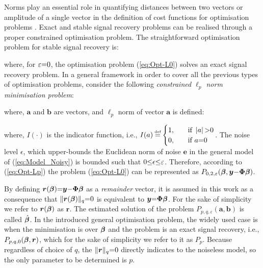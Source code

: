 Norms play an essential role in quantifying distances between two vectors or amplitude of a single vector in the definition of cost functions for optimisation problems \cite{Walter2014}.
Exact and stable signal recovery problems can be realised through a proper constrained optimisation problem.
The straightforward optimisation problem for stable signal recovery is:

where, for $\varepsilon {=} 0$, the optimisation problem (\ref{eq:Opt-L0}) solves an exact signal recovery problem.
In a general framework in order to cover all the previous types of optimisation problems, consider the following \emph{constrained $\ell_p$ norm minimisation problem}:

where, $\boldsymbol{a}$ and $\boldsymbol{b}$ are vectors, and $\ell_p$ norm of vector $\boldsymbol{a}$ is defined:

where, $I(\cdot)$ is the indicator function, i.e., $I(a) \myeq
  \begin{cases}
    1,  & \quad \text{if } \myabs{a} \sg 0\\
    0,  & \quad \text{if } a \seq 0\\
  \end{cases}$.
The noise level $\epsilon$, which upper-bounds the Euclidean norm of noise $\boldsymbol{e}$ in the general model of (\ref{eq:Model_Noisy}) is bounded such that $0 {\leq} \epsilon {\leq} \varepsilon$.
Therefore, according to (\ref{eq:Opt-Lp}) the problem (\ref{eq:Opt-L0}) can be represented as $P_{0,2,\varepsilon} (\boldsymbol{\beta},\boldsymbol{y} {-} \boldsymbol{\Phi} \boldsymbol{\beta})$.

By defining $\boldsymbol{r} (\boldsymbol{\beta}) {=} \boldsymbol{y} {-} \boldsymbol{\Phi} \boldsymbol{\beta}$ as a \emph{remainder} vector, it is assumed in this work as a consequence that $\Vert \boldsymbol{r} (\boldsymbol{\beta}) \Vert _q {=} 0$ is equivalent to $\boldsymbol{y} {=} \boldsymbol{\Phi} \boldsymbol{\beta}$. 
For the sake of simplicity we refer to $\boldsymbol{r} (\boldsymbol{\beta})$ as $\boldsymbol{r}$.
The estimated solution of the problem $P_{p,q,\varepsilon} (\boldsymbol{a},\boldsymbol{b})$ is called $\hat{\boldsymbol{\beta}}$.
In the introduced general optimisation problem, the widely used case is when the minimisation is over $\boldsymbol{\beta}$ and the problem is an exact signal recovery, i.e., $P_{p,q,0} (\boldsymbol{\beta},\boldsymbol{r})$, which for the sake of simplicity we refer to it as $P_p$.
Because regardless of choice of $q$, the $\Vert \boldsymbol{r} \Vert _q {=} 0$ directly indicates to the noiseless model, so the only parameter to be determined is $p$.

